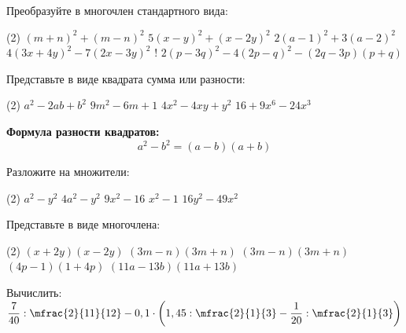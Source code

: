 \begin{class}[number=5]
	\begin{listofex}
		\item Преобразуйте в многочлен стандартного вида:
		\begin{tasks}(2)
			\task \( (m+n)^2+(m-n)^2 \)
			\task \( 5(x-y)^2+(x-2y)^2 \)
			\task \( 2(a-1)^2+3(a-2)^2 \)
			\task \( 4(3x+4y)^2-7(2x-3y)^2 \)
			\task! \( 2(p-3q)^2-4(2p-q)^2-(2q-3p)(p+q) \)
		\end{tasks}
		\item Представьте в виде квадрата сумма или разности:
		\begin{tasks}(2)
			\task \( a^2-2ab+b^2 \)
			\task \( 9m^2-6m+1 \)
			\task \( 4x^2-4xy+y^2 \)
			\task \( 16+9x^6-24x^3 \)
		\end{tasks}
	\end{listofex}
	\textbf{Формула разности квадратов:}
	\[ a^2-b^2=(a-b)(a+b) \]
	\begin{listofex}
		\item Разложите на множители:
		\begin{tasks}(2)
			\task \( a^2-y^2 \)
			\task \( 4a^2-y^2 \)
			\task \( 9x^2-16 \)
			\task \( x^2-1 \)
			\task \( 16y^2-49x^2 \)
		\end{tasks}
		\item Представьте в виде многочлена:
		\begin{tasks}(2)
			\task \( (x+2y)(x-2y) \)
			\task \( (3m-n)(3m+n) \)
			\task \( (3m-n)(3m+n) \)
			\task \( (4p-1)(1+4p) \)
			\task \( (11a-13b)(11a+13b) \)
		\end{tasks}
		\item Вычислить: \( \dfrac{7}{40} : \mfrac{2}{11}{12} - 0,1 \cdot \left( 1,45 : \mfrac{2}{1}{3} - \dfrac{1}{20} : \mfrac{2}{1}{3} \right) \)
	\end{listofex}
\end{class}


